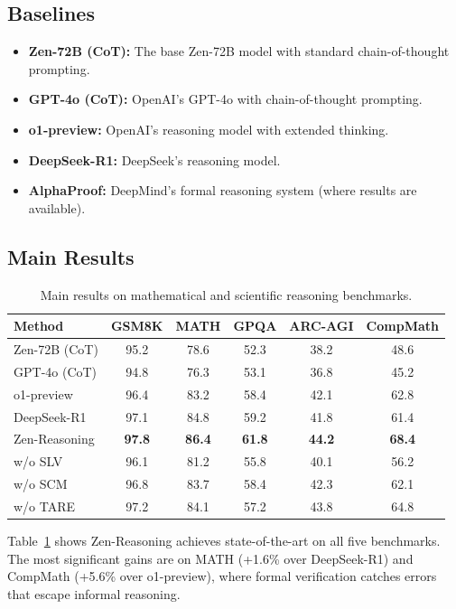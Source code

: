 \documentclass[11pt,a4paper]{article}
\begin{document}
\subsection{Baselines}

\begin{itemize}
    \item \textbf{Zen-72B (CoT):} The base Zen-72B model with standard chain-of-thought prompting.
    \item \textbf{GPT-4o (CoT):} OpenAI's GPT-4o with chain-of-thought prompting.
    \item \textbf{o1-preview:} OpenAI's reasoning model with extended thinking.
    \item \textbf{DeepSeek-R1:} DeepSeek's reasoning model.
    \item \textbf{AlphaProof:} DeepMind's formal reasoning system (where results are available).
\end{itemize}

\subsection{Main Results}

\begin{table}[t]
\centering
\caption{Main results on mathematical and scientific reasoning benchmarks.}
\label{tab:main_results}
\begin{tabular}{lccccc}
\toprule
\textbf{Method} & \textbf{GSM8K} & \textbf{MATH} & \textbf{GPQA} & \textbf{ARC-AGI} & \textbf{CompMath} \\
\midrule
Zen-72B (CoT) & 95.2 & 78.6 & 52.3 & 38.2 & 48.6 \\
GPT-4o (CoT) & 94.8 & 76.3 & 53.1 & 36.8 & 45.2 \\
o1-preview & 96.4 & 83.2 & 58.4 & 42.1 & 62.8 \\
DeepSeek-R1 & 97.1 & 84.8 & 59.2 & 41.8 & 61.4 \\
\midrule
Zen-Reasoning & \textbf{97.8} & \textbf{86.4} & \textbf{61.8} & \textbf{44.2} & \textbf{68.4} \\
\quad w/o SLV & 96.1 & 81.2 & 55.8 & 40.1 & 56.2 \\
\quad w/o SCM & 96.8 & 83.7 & 58.4 & 42.3 & 62.1 \\
\quad w/o TARE & 97.2 & 84.1 & 57.2 & 43.8 & 64.8 \\
\bottomrule
\end{tabular}
\end{table}

Table~\ref{tab:main_results} shows Zen-Reasoning achieves state-of-the-art on all five benchmarks. The most significant gains are on MATH (+1.6\% over DeepSeek-R1) and CompMath (+5.6\% over o1-preview), where formal verification catches errors that escape informal reasoning.
\end{document}
